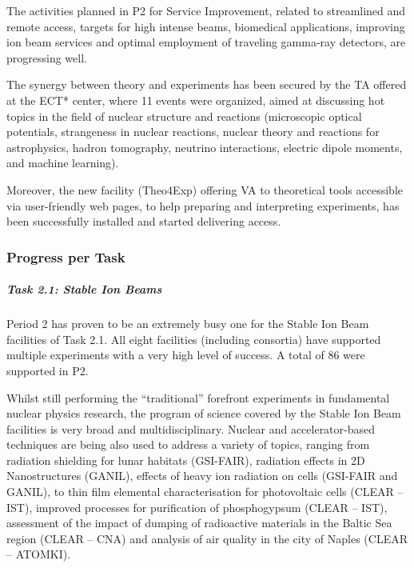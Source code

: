 The activities planned in P2 for Service Improvement, related to streamlined and remote access, targets for high intense beams, biomedical applications, improving ion beam services and optimal employment of traveling gamma-ray detectors, are progressing well. 

The synergy between theory and experiments has been secured by the TA offered at the ECT* center, where 11 events were organized, aimed at 
discussing hot topics in the field of nuclear structure and reactions
(microscopic optical potentials, strangeness in nuclear reactions, nuclear theory and reactions for astrophysics, hadron tomography, neutrino interactions, electric dipole moments,  and machine learning). 

Moreover, the new facility (Theo4Exp) offering VA to theoretical tools accessible via user-friendly web pages, to help preparing and interpreting experiments, has been successfully installed and started delivering access.
\subsubsection*{Progress per Task}
\subparagraph{Task 2.1: Stable Ion Beams} \mbox{}


Period 2 has proven to be an extremely busy one for the Stable Ion Beam facilities of Task 2.1. All eight facilities (including consortia) have supported multiple experiments with a very high level of success. A total of 86 were supported in P2.

Whilst still performing the “traditional” forefront experiments in fundamental nuclear physics research, the program of science covered by the Stable Ion Beam facilities is very broad and multidisciplinary. Nuclear and accelerator-based techniques are being also used to address a variety of topics, 
ranging from radiation shielding for lunar habitats (GSI-FAIR), radiation effects in 2D Nanostructures (GANIL), effects of heavy ion radiation on cells (GSI-FAIR and GANIL), to thin film elemental characterisation for photovoltaic cells (CLEAR – IST), improved processes for purification of phosphogypsum (CLEAR – IST), assessment of the impact of dumping of radioactive materials in the Baltic Sea region (CLEAR – CNA) and analysis of air quality in the city of Naples (CLEAR – ATOMKI).

